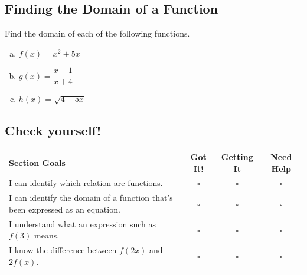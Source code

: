 \documentclass[oneside,10pt]{book}
\begin{document}
\newpage


\subsection{Finding the Domain of a Function}


\example
Find the domain of each of the following functions.

\begin{enumerate}[(a)]
  \item
  $f(x) = x^2 + 5x $
  \vfill
  \item
    $g(x) = \dfrac{x-1}{x+4}$
  \vfill
  \item
    $h(x) = \sqrt{4 - 5x}$
  \vfill

\end{enumerate}


\subsection*{Check yourself!}


\begin{tabular}{@{}p{4.5in} c c c}
\textbf{Section Goals} & \textbf{Got It!} & \textbf{Getting It} & \textbf{Need Help}\\
I can identify which relation are functions. & $\square$ & $\square$ & $\square $ \\
I can identify the domain of a function that's been expressed as an equation. & $\square$ & $\square$ & $\square $ \\
I understand what an expression such as $f(3)$ means. & $\square$ & $\square$ & $\square $ \\
I know the difference between $f(2x)$ and $2f(x)$. & $\square$ & $\square$ & $\square $ \\


\end{tabular}
\end{document}
